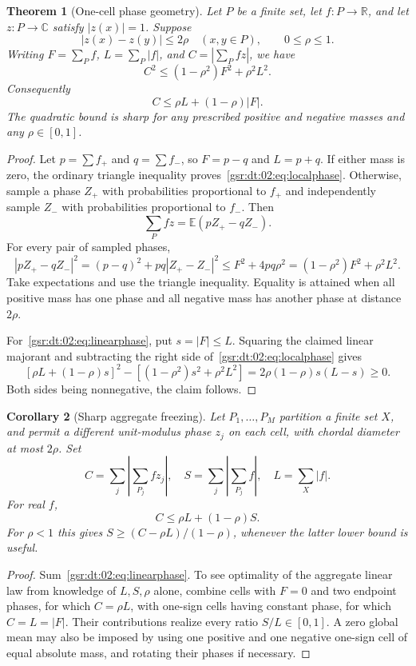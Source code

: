 \documentclass[11pt,letterpaper]{article}
\numberwithin{equation}{section}
\newtheorem{theorem}{Theorem}[section]
\newtheorem{corollary}[theorem]{Corollary}
\theoremstyle{definition}
\theoremstyle{remark}
\newcommand{\E}{\mathbb E}
\newcommand{\R}{\mathbb R}
\newcommand{\C}{\mathbb C}
\newcommand{\1}{\mathbf 1}
\begin{document}
\begin{theorem}[One-cell phase geometry]\label{gsr:dt:02:thm:localphase}
Let $P$ be a finite set, let $f:P\to\R$, and let $z:P\to\C$ satisfy $|z(x)|=1$. Suppose
\[
 |z(x)-z(y)|\leq2\rho\quad(x,y\in P),\qquad 0\leq\rho\leq1.
\]
Writing $F=\sum_P f$, $L=\sum_P|f|$, and $C=|\sum_Pfz|$, we have
\begin{equation}\label{gsr:dt:02:eq:localphase}
 \boxed{\quad C^2\leq(1-\rho^2)F^2+\rho^2L^2.\quad}
\end{equation}
Consequently
\begin{equation}\label{gsr:dt:02:eq:linearphase}
 C\leq\rho L+(1-\rho)|F|.
\end{equation}
The quadratic bound is sharp for any prescribed positive and negative masses and any $\rho\in[0,1]$.
\end{theorem}
\begin{proof}
Let $p=\sum f_+$ and $q=\sum f_-$, so $F=p-q$ and $L=p+q$. If either mass is zero, the ordinary triangle inequality proves~\eqref{gsr:dt:02:eq:localphase}. Otherwise, sample a phase $Z_+$ with probabilities proportional to $f_+$ and independently sample $Z_-$ with probabilities proportional to $f_-$. Then
\[
 \sum_P fz=\E(pZ_+-qZ_-).
\]
For every pair of sampled phases,
\[
 |pZ_+-qZ_-|^2=(p-q)^2+pq|Z_+-Z_-|^2
 \leq F^2+4pq\rho^2=(1-\rho^2)F^2+\rho^2L^2.
\]
Take expectations and use the triangle inequality. Equality is attained when all positive mass has one phase and all negative mass has another phase at distance $2\rho$.

For~\eqref{gsr:dt:02:eq:linearphase}, put $s=|F|\leq L$. Squaring the claimed linear majorant and subtracting the right side of~\eqref{gsr:dt:02:eq:localphase} gives
\[
 [\rho L+(1-\rho)s]^2-[(1-\rho^2)s^2+\rho^2L^2]
 =2\rho(1-\rho)s(L-s)\geq0.
\]
Both sides being nonnegative, the claim follows.
\end{proof}

\begin{corollary}[Sharp aggregate freezing]\label{gsr:dt:02:cor:freezing}
Let $P_1,\ldots,P_M$ partition a finite set $X$, and permit a different unit-modulus phase $z_j$ on each cell, with chordal diameter at most $2\rho$. Set
\[
 C=\sum_j\left|\sum_{P_j}fz_j\right|,\quad
 S=\sum_j\left|\sum_{P_j}f\right|,\quad L=\sum_X|f|.
\]
For real $f$,
\begin{equation}\label{gsr:dt:02:eq:aggregatephase}
 C\leq\rho L+(1-\rho)S.
\end{equation}
For $\rho<1$ this gives $S\geq(C-\rho L)/(1-\rho)$, whenever the latter lower bound is useful.
\end{corollary}
\begin{proof}
Sum~\eqref{gsr:dt:02:eq:linearphase}. To see optimality of the aggregate linear law from knowledge of $L,S,\rho$ alone, combine cells with $F=0$ and two endpoint phases, for which $C=\rho L$, with one-sign cells having constant phase, for which $C=L=|F|$. Their contributions realize every ratio $S/L\in[0,1]$. A zero global mean may also be imposed by using one positive and one negative one-sign cell of equal absolute mass, and rotating their phases if necessary.
\end{proof}
\end{document}
